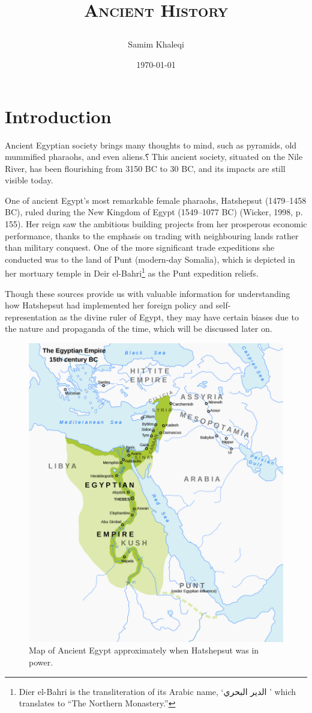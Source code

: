 \documentclass[12pt, letterpaper]{article}
\title{\Huge\center{The Punt Reliefs and Their Significance on Hatshepsut's Reign}

\Large\scshape{Ancient History}}
\author{Samim Khaleqi}
\date{\today}
\begin{document}
\maketitle

\pagebreak
\tableofcontents
\pagebreak

\section*{Introduction}
Ancient Egyptian society brings many thoughts to mind, such as pyramids, old mummified pharaohs, and even aliens.⸮ This ancient society, situated on the Nile River, has been flourishing from 3150 BC to 30 BC, and its impacts are still visible today.

One of ancient Egypt's most remarkable female pharaohs, Hatshepsut (1479–1458 BC), ruled during the New Kingdom of Egypt (1549–1077 BC) (Wicker, 1998, p. 155). Her reign saw the ambitious building projects from her prosperous economic performance, thanks to the emphasis on trading with neighbouring lands rather than military conquest. One of the more significant trade expeditions she conducted was to the land of Punt (modern-day Somalia), which is depicted in her mortuary temple in Deir el-Bahri\footnote{Dier el-Bahri is the transliteration of its Arabic name, ‘\textarabic{الدير البحري} ’ which translates to “The Northern Monastery.”} as the Punt expedition reliefs.

Though these sources provide us with valuable information for understanding how Hatshepsut had implemented her foreign policy and self- \\ representation as the divine ruler of Egypt, they may have certain biases due to the nature and propaganda of the time, which will be discussed later on.

\newpage
\begin{figure}
    \centering
    \includegraphics[width=0.8\linewidth]{img/map1.png}
    \caption{Map of Ancient Egypt approximately when Hatshepsut was in power.}
    \label{fig:enter-label}
\end{figure}
\end{document}
